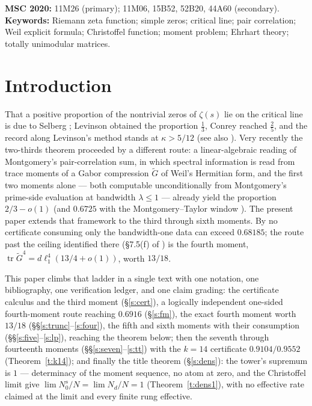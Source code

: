 \documentclass[11pt]{article}
\numberwithin{equation}{section}
\theoremstyle{definition}
\theoremstyle{remark}
\begin{document}
\medskip
\noindent\textbf{MSC 2020:} 11M26 (primary); 11M06, 15B52,
52B20, 44A60 (secondary).\\
\textbf{Keywords:} Riemann zeta function; simple zeros;
critical line; pair correlation; Weil explicit formula;
Christoffel function; moment problem; Ehrhart theory;
totally unimodular matrices.

\newpage
\tableofcontents
\newpage
\section{Introduction}\label{s:intro}

That a positive proportion of the nontrivial zeros of $\zeta(s)$
lie on the critical line is due to Selberg \cite{Sel42}; Levinson
\cite{Lev74} obtained the proportion $\tfrac13$, Conrey
\cite{Con89} reached $\tfrac25$, and the record along Levinson's
method stands at $\kappa>5/12$ \cite{PRZZ} (see also
\cite{BCY11,Fen12}). Very recently the two-thirds theorem
\cite{C26} proceeded by a different route: a linear-algebraic
reading of Montgomery's pair-correlation sum, in which spectral
information is read from trace moments of a Gabor compression
$\widetilde G$ of Weil's Hermitian form, and the first two
moments alone --- both computable unconditionally from
Montgomery's prime-side evaluation at bandwidth $\lambda\le1$
\cite{Mon73,BGST} --- already yield the proportion $2/3-o(1)$
(and $0.6725$ with the Montgomery--Taylor window \cite{Mon75}).
The present paper extends that framework to the third through
sixth moments. By \cite[Rem.~1.1]{C26} no certificate consuming
only the bandwidth-one data can exceed $0.68185$; the route past
the ceiling identified there (\S7.5(f) of \cite{C26}) is the
fourth moment,
$\operatorname{tr}\widetilde G^{4}=d\ell_1^{4}(13/4+o(1))$, worth
$13/18$.

This paper climbs that ladder in a single
text with one notation, one bibliography, one verification
ledger, and one claim grading: the certificate calculus and the
third moment (\S\ref{s:cert}), a logically independent
one-sided fourth-moment route reaching $0.6916$ (\S\ref{s:fm}),
the exact fourth moment worth $13/18$
(\S\S\ref{s:trunc}--\ref{s:four}), the fifth and sixth
moments with their consumption
(\S\S\ref{s:five}--\ref{s:lp}), reaching the theorem
below; then the seventh through fourteenth moments
(\S\S\ref{s:seven}--\ref{s:tt}) with the $k=14$ certificate
$0.9104/0.9552$ (Theorem~\ref{t:k14}); and finally the
title theorem (\S\ref{s:dens}): the tower's supremum is
$1$ --- determinacy of the moment sequence, no atom at zero,
and the Christoffel limit give
$\lim N_0^{s}/N=\lim N_d/N=1$
(Theorem~\ref{t:dens1}), with no effective rate claimed at
the limit and every finite rung effective.
\end{document}

